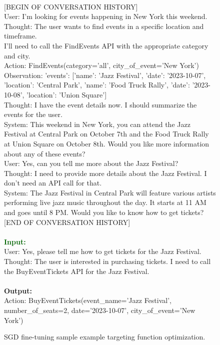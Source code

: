 \begin{figure*}[!ht]
\begin{tcolorbox}[colback=gray!5!white,colframe=black!95!black,title=\textbf{\small{SGD Instruction Sample} | \textbf{Format:} Action Optimization}]
 \\
{[BEGIN OF CONVERSATION HISTORY]} \\
User: I'm looking for events happening in New York this weekend. \\
Thought: The user wants to find events in a specific location and timeframe.  \\
I'll need to call the FindEvents API with the appropriate category and city. \\
Action: FindEvents(category='all', city\_of\_event='New York') \\
Observation: {'events': [{'name': 'Jazz Festival', 'date': '2023-10-07', 'location': 'Central Park'}, {'name': 'Food Truck Rally', 'date': '2023-10-08', 'location': 'Union Square'}]} \\
Thought: I have the event details now. I should summarize the events for the user. \\
System: This weekend in New York, you can attend the Jazz Festival at Central Park on October 7th and the Food Truck Rally at Union Square on October 8th. Would you like more information about any of these events? \\
User: Yes, can you tell me more about the Jazz Festival? \\
Thought: I need to provide more details about the Jazz Festival. I don't need an API call for that. \\
System: The Jazz Festival in Central Park will feature various artists performing live jazz music throughout the day. It starts at 11 AM and goes until 8 PM. Would you like to know how to get tickets? \\
{[END OF CONVERSATION HISTORY]} \\
 \\
\small \textcolor{darkgreen}{\textbf{Input:}} \\
User: Yes, please tell me how to get tickets for the Jazz Festival. \\
Thought: The user is interested in purchasing tickets. I need to call the BuyEventTickets API for the Jazz Festival. \\
 \\
\small \textcolor{mypurple}{\textbf{Output:}} \\
Action: BuyEventTickets(event\_name='Jazz Festival', number\_of\_seats=2, date='2023-10-07', city\_of\_event='New York')\\
\end{tcolorbox}

\vspace{-0.25cm}
\caption{SGD fine-tuning sample example targeting function optimization.}
\label{tab:sgd-sft-action}
\end{figure*}


